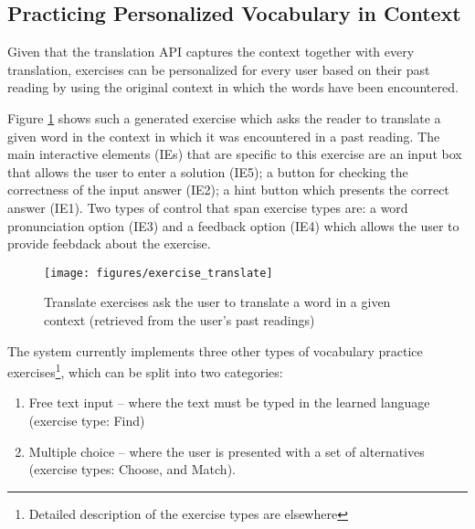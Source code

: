 
\subsection{Practicing Personalized Vocabulary in Context}

Given that the translation API captures the context together with every translation, exercises can be personalized for every user based on their past reading by using the original context in which the words have been encountered.

Figure \ref{fig:exercise_translate} shows such a generated exercise which asks the reader to translate a given word in the context in which it was encountered in a past reading. The main interactive elements (IEs) that are specific to this exercise are an input box that allows the user to enter a solution (IE5); a button for checking the correctness of the input answer (IE2); a hint button which presents the correct answer (IE1). Two types of control that span exercise types are: a word pronunciation option (IE3) and a feedback option (IE4) which allows the user to provide feebdack about the exercise.

\begin{figure}[h!]
\centering
  \texttt{[image: figures/exercise\_translate]}
  \caption{Translate exercises ask the user to translate a word in a given context (retrieved from the user's past readings)}
  \label{fig:exercise_translate}
\end{figure}

	The system currently implements three other types of vocabulary practice exercises\footnote{Detailed description of the exercise types are elsewhere\cite{Avagyan17a-blocks}}, which can be split into two categories: 
\begin{enumerate}
	
	\item Free text input -- where the text must be typed in the learned language (exercise type: Find)

	\item Multiple choice -- where the user is presented with a set of alternatives (exercise types: Choose, and Match). 

\end{enumerate}


